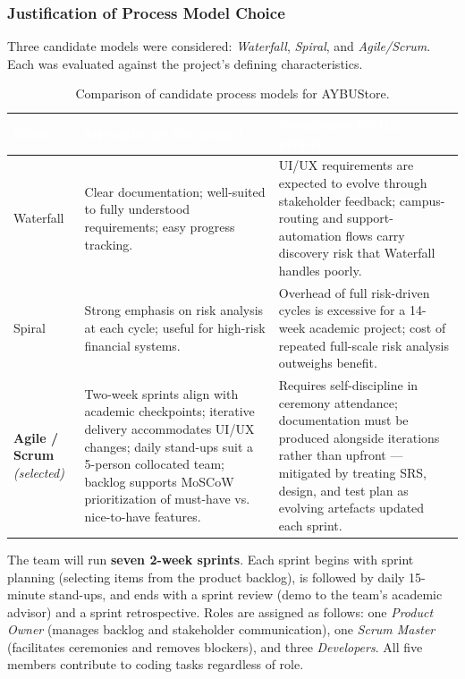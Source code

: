 \documentclass[11pt,a4paper]{article}
\begin{document}
\subsubsection*{Justification of Process Model Choice}
Three candidate models were considered: \emph{Waterfall},
\emph{Spiral}, and \emph{Agile/Scrum}. Each was evaluated against the
project's defining characteristics.
 
\begin{table}[H]
\centering
\small
\begin{tabular}{|p{}|p{}|p{}|}
\hline
\rowcolor{aybuHeader}
\textcolor{white}{\textbf{Model}} &
\textcolor{white}{\textbf{Strengths for this project}} &
\textcolor{white}{\textbf{Weaknesses for this project}} \\ \hline
 
Waterfall & Clear documentation; well-suited to fully understood
requirements; easy progress tracking. & UI/UX requirements are
expected to evolve through stakeholder feedback; campus-routing and
support-automation flows carry discovery risk that Waterfall handles
poorly. \\ \hline
 
Spiral & Strong emphasis on risk analysis at each cycle; useful for
high-risk financial systems. & Overhead of full risk-driven cycles is
excessive for a 14-week academic project; cost of repeated full-scale
risk analysis outweighs benefit. \\ \hline
 
\textbf{Agile / Scrum} \emph{(selected)} & Two-week sprints align with
academic checkpoints; iterative delivery accommodates UI/UX changes;
daily stand-ups suit a 5-person collocated team; backlog supports
MoSCoW prioritization of must-have vs. nice-to-have features. &
Requires self-discipline in ceremony attendance; documentation must
be produced alongside iterations rather than upfront --- mitigated by
treating SRS, design, and test plan as evolving artefacts updated
each sprint. \\ \hline
\end{tabular}
\caption{Comparison of candidate process models for AYBUStore.}
\label{tab:process-models}
\end{table}
 
The team will run \textbf{seven 2-week sprints}. Each sprint begins
with sprint planning (selecting items from the product backlog), is
followed by daily 15-minute stand-ups, and ends with a sprint review
(demo to the team's academic advisor) and a sprint retrospective.
Roles are assigned as follows: one \emph{Product Owner} (manages
backlog and stakeholder communication), one \emph{Scrum Master}
(facilitates ceremonies and removes blockers), and three
\emph{Developers}. All five members contribute to coding tasks
regardless of role.
 
\end{document}
